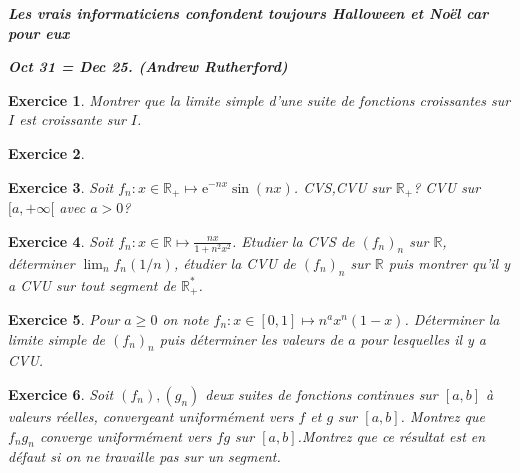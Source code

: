 \documentclass[12pt,a4paper]{article}
\newcommand{\R}{\mathbb{R}}
\theoremstyle{break}
\theoremstyle{break}
\newtheorem{Exo}{Exercice}
\begin{document}
\emph{\textbf{
		Les vrais informaticiens confondent toujours Halloween et Noël car pour eux 
}}

\emph{\textbf{
	Oct 31 = Dec 25.
		(Andrew Rutherford)
}}

\begin{Exo}
	Montrer que la limite simple d'une suite de fonctions croissantes sur $I$ est croissante sur $I$.
\end{Exo}


\begin{Exo}
	

\end{Exo}
\begin{Exo}
Soit $f_n:x\in\R_+\mapsto \mathrm{e}^{-nx}\sin(nx)$. CVS,CVU sur $\R_+$? CVU sur $[a,+\infty[$ avec $a>0$?
\end{Exo}

\begin{Exo}
	Soit $f_n:x\in\R\mapsto \frac{nx}{1+n^2x^2}$. Etudier la CVS de $(f_n)_n$ sur $\R$, déterminer $\lim_n f_n(1/n)$, étudier  la CVU de $(f_n)_n$ sur $\R$ puis montrer qu'il y a CVU sur tout segment de $\R_+^*$.

\end{Exo}

%

\begin{Exo}
Pour $a\geqslant 0$ on note $f_n:x\in[0,1]\mapsto n^a x^n(1-x)$. Déterminer la limite simple de $(f_n)_n$ puis déterminer les valeurs de $a$ pour lesquelles il y a CVU.
\end{Exo}

\begin{Exo}
	Soit $\left( f_{n}\right) ,\left( g_{n}\right) $ deux suites de fonctions continues sur $\left[ a,b\right] $ à valeurs r\'{e}elles, convergeant	uniformément vers $f$ et $g$ sur $\left[ a,b\right]$. Montrez que $f_{n}g_{n}$ converge uniformément vers $fg$ sur $\left[ a,b\right]$.Montrez que ce résultat est en défaut si on ne travaille pas sur un
	segment.
\end{Exo}
\end{document}

